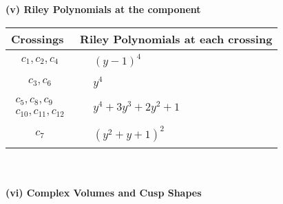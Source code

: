 \documentclass[1p]{elsarticle_modified}
\theoremstyle{definition}
\begin{document}
\newpage\renewcommand{\arraystretch}{1}
\flushleft \textbf{(v) Riley Polynomials at the component}\newline \\
\begin{tabular}{m{50pt}|m{274pt}}
Crossings & \hspace{64pt}Riley Polynomials at each crossing \\
\hline $$\begin{aligned}c_{1},c_{2},c_{4}\end{aligned}$$&$\begin{aligned}
&(y-1)^4
\end{aligned}$\\
\hline $$\begin{aligned}c_{3},c_{6}\end{aligned}$$&$\begin{aligned}
&y^4
\end{aligned}$\\
\hline $$\begin{aligned}c_{5},c_{8},c_{9}\\c_{10},c_{11},c_{12}\end{aligned}$$&$\begin{aligned}
&y^4+3 y^3+2 y^2+1
\end{aligned}$\\
\hline $$\begin{aligned}c_{7}\end{aligned}$$&$\begin{aligned}
&(y^2+y+1)^2
\end{aligned}$\\
\hline
\end{tabular}\\~\\
\newpage\flushleft \textbf{(vi) Complex Volumes and Cusp Shapes}
\end{document}
